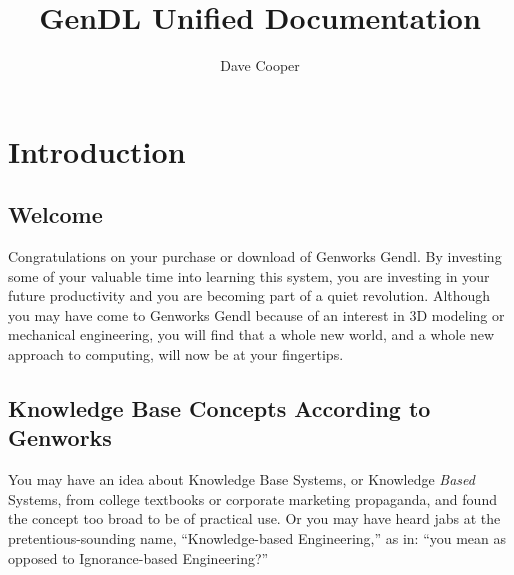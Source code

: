 \documentclass [11pt]{book}
\author {Dave Cooper}
\title {GenDL Unified Documentation}
\begin{document}
\frontmatter



\maketitle



\tableofcontents



\mainmatter



\chapter{Introduction}

\label{chap:introduction}



\section{Welcome}

\label{sec:welcome}

Congratulations on your purchase or download of Genworks Gendl. By investing some of your 
valuable time into learning this system, you are investing in your future productivity and you are becoming
part of a quiet revolution. Although you may have come to Genworks Gendl because of an interest in 3D modeling
or mechanical engineering, you will find that a whole new world, and a whole new approach to computing, will 
now be at your fingertips.

\section{Knowledge Base Concepts According to Genworks}

\label{sec:knowledgebaseconceptsaccordingtogenworks}

You may have an idea about Knowledge Base Systems,
or Knowledge \emph{Based} Systems, from college textbooks or corporate marketing propaganda, and found the 
concept too broad to be of practical use. Or you may have heard jabs at the 
pretentious-sounding name, ``Knowledge-based Engineering,'' as in: ``you mean as opposed to Ignorance-based Engineering?'' 
\end{document}
